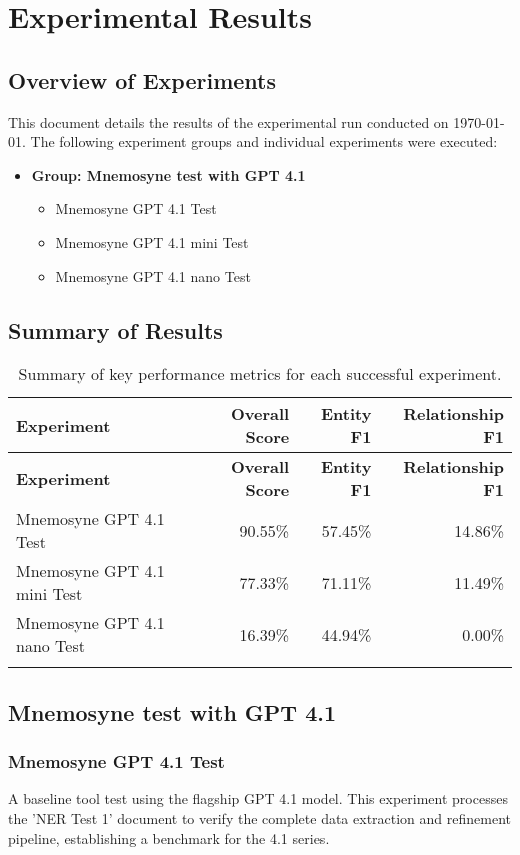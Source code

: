 \chapter{Experimental Results}
\section{Overview of Experiments}
This document details the results of the experimental run conducted on \today.
The following experiment groups and individual experiments were executed:
\begin{itemize}
  \item \textbf{Group: Mnemosyne test with GPT 4.1}
  \begin{itemize}
    \item Mnemosyne GPT 4.1 Test
    \item Mnemosyne GPT 4.1 mini Test
    \item Mnemosyne GPT 4.1 nano Test
  \end{itemize}
\end{itemize}
\section{Summary of Results}
\begin{longtable}{p{}rrr}
\toprule
\textbf{Experiment} & \textbf{Overall Score} & \textbf{Entity F1} & \textbf{Relationship F1} \\
\midrule
\endfirsthead
\toprule
\textbf{Experiment} & \textbf{Overall Score} & \textbf{Entity F1} & \textbf{Relationship F1} \\
\midrule
\endhead
Mnemosyne GPT 4.1 Test & 90.55\% & 57.45\% & 14.86\% \\
Mnemosyne GPT 4.1 mini Test & 77.33\% & 71.11\% & 11.49\% \\
Mnemosyne GPT 4.1 nano Test & 16.39\% & 44.94\% & 0.00\% \\
\bottomrule
\caption{Summary of key performance metrics for each successful experiment.}
\end{longtable}
\clearpage
\section{Mnemosyne test with GPT 4.1}
\subsection{Mnemosyne GPT 4.1 Test}
A baseline tool test using the flagship GPT 4.1 model. This experiment processes the 'NER Test 1' document to verify the complete data extraction and refinement pipeline, establishing a benchmark for the 4.1 series.

